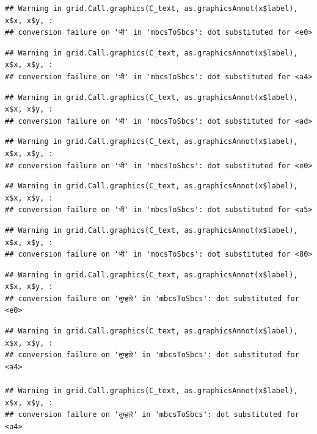 \documentclass[
]{article}
\begin{document}
\begin{verbatim}
## Warning in grid.Call.graphics(C_text, as.graphicsAnnot(x$label), x$x, x$y, :
## conversion failure on 'भी' in 'mbcsToSbcs': dot substituted for <e0>
\end{verbatim}

\begin{verbatim}
## Warning in grid.Call.graphics(C_text, as.graphicsAnnot(x$label), x$x, x$y, :
## conversion failure on 'भी' in 'mbcsToSbcs': dot substituted for <a4>
\end{verbatim}

\begin{verbatim}
## Warning in grid.Call.graphics(C_text, as.graphicsAnnot(x$label), x$x, x$y, :
## conversion failure on 'भी' in 'mbcsToSbcs': dot substituted for <ad>
\end{verbatim}

\begin{verbatim}
## Warning in grid.Call.graphics(C_text, as.graphicsAnnot(x$label), x$x, x$y, :
## conversion failure on 'भी' in 'mbcsToSbcs': dot substituted for <e0>
\end{verbatim}

\begin{verbatim}
## Warning in grid.Call.graphics(C_text, as.graphicsAnnot(x$label), x$x, x$y, :
## conversion failure on 'भी' in 'mbcsToSbcs': dot substituted for <a5>
\end{verbatim}

\begin{verbatim}
## Warning in grid.Call.graphics(C_text, as.graphicsAnnot(x$label), x$x, x$y, :
## conversion failure on 'भी' in 'mbcsToSbcs': dot substituted for <80>
\end{verbatim}

\begin{verbatim}
## Warning in grid.Call.graphics(C_text, as.graphicsAnnot(x$label), x$x, x$y, :
## conversion failure on 'तुम्हारे' in 'mbcsToSbcs': dot substituted for <e0>
\end{verbatim}

\begin{verbatim}
## Warning in grid.Call.graphics(C_text, as.graphicsAnnot(x$label), x$x, x$y, :
## conversion failure on 'तुम्हारे' in 'mbcsToSbcs': dot substituted for <a4>

## Warning in grid.Call.graphics(C_text, as.graphicsAnnot(x$label), x$x, x$y, :
## conversion failure on 'तुम्हारे' in 'mbcsToSbcs': dot substituted for <a4>
\end{verbatim}
\end{document}
